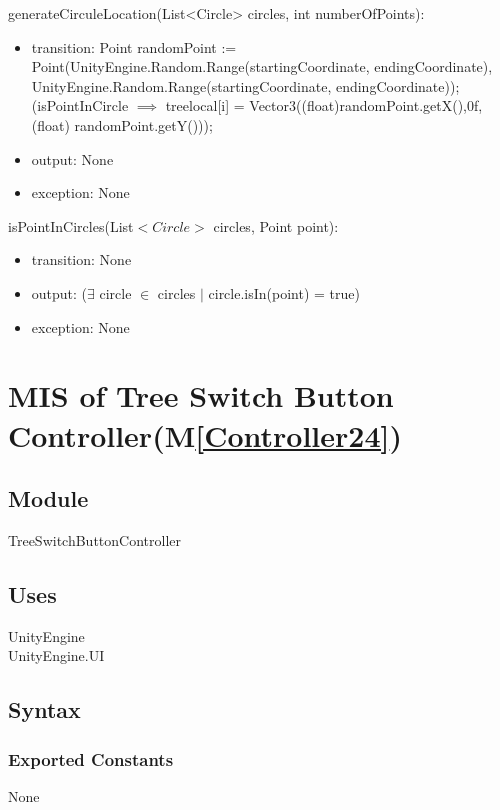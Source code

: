 \documentclass[12pt, titlepage]{article}
\newcommand{\mref}[1]{M\ref{#1}}
\begin{document}
\noindent generateCirculeLocation(List<Circle> circles, int numberOfPoints):
\begin{itemize}
\item transition: 
Point randomPoint := Point(UnityEngine.Random.Range(startingCoordinate, endingCoordinate), UnityEngine.Random.Range(startingCoordinate, endingCoordinate));\\
(isPointInCircle $\implies$ treelocal[i] = Vector3((float)randomPoint.getX(),0f, (float) randomPoint.getY()));

\item output: None
\item exception: None
\end{itemize}

\noindent isPointInCircles(List$<Circle>$ circles, Point point):
\begin{itemize}
\item transition: None

\item output: ($\exists$ circle $\in$ circles $|$ circle.isIn(point) = true)

\item exception: None
\end{itemize}

\newpage

\section{MIS of Tree Switch Button Controller(\mref{Controller24})}   

\subsection{Module}

TreeSwitchButtonController

\subsection{Uses}

UnityEngine\\
UnityEngine.UI\\

\subsection{Syntax}
\subsubsection{Exported Constants}
None
\end{document}

